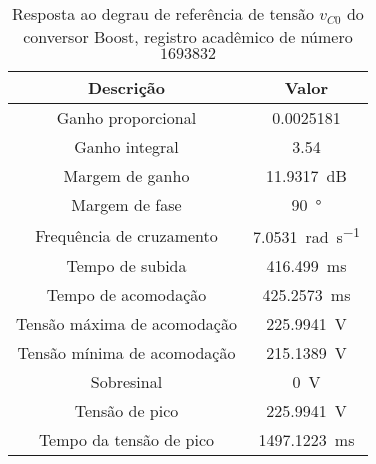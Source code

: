 \begin{table}[!ht]
\centering
\caption{Resposta ao degrau de referência de tensão $v_{C0}$ do conversor Boost, registro acadêmico de número $1693832$}
\label{tab:resposta1malha}
\begin{tabular}{@{}cc@{}}
\toprule
\textbf{Descrição} & \textbf{Valor}\\ \midrule
Ganho proporcional & \SI{0.0025181}{}\\
Ganho integral & \SI{3.54}{}\\
Margem de ganho & \SI{11.9317}{\deci\bel}\\
Margem de fase & \SI{90}{\degree}\\
Frequência de cruzamento & \SI{7.0531}{\radian\per\s}\\
Tempo de subida & \SI{416.499}{\milli\s}\\
Tempo de acomodação & \SI{425.2573}{\milli\s}\\
Tensão máxima de acomodação & \SI{225.9941}{\V}\\
Tensão mínima de acomodação & \SI{215.1389}{\V}\\
Sobresinal & \SI{0}{\V}\\
Tensão de pico & \SI{225.9941}{\V}\\
Tempo da tensão de pico & \SI{1497.1223}{\milli\s}\\
\bottomrule
\end{tabular}
\end{table}

